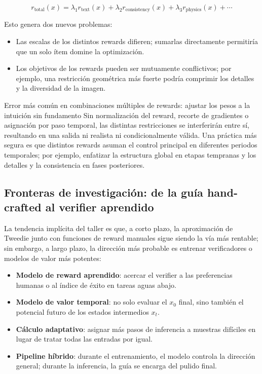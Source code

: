$$r_{\text{total}}(x) = \lambda_1 r_{\text{text}}(x) + \lambda_2 r_{\text{consistency}}(x) + \lambda_3 r_{\text{physics}}(x) + \cdots$$

Esto genera dos nuevos problemas:

\begin{itemize}
    \item Las escalas de los distintos rewards difieren; sumarlas directamente permitiría que un solo ítem domine la optimización.
    \item Los objetivos de los rewards pueden ser mutuamente conflictivos; por ejemplo, una restricción geométrica más fuerte podría comprimir los detalles y la diversidad de la imagen.
\end{itemize}

\begin{warningbox}{Error más común en combinaciones múltiples de rewards: ajustar los pesos a la intuición sin fundamento}
Sin normalización del reward, recorte de gradientes o asignación por paso temporal, las distintas restricciones se interferirán entre sí, resultando en una salida ni realista ni condicionalmente válida. Una práctica más segura es que distintos rewards asuman el control principal en diferentes periodos temporales; por ejemplo, enfatizar la estructura global en etapas tempranas y los detalles y la consistencia en fases posteriores.
\end{warningbox}

\subsection{Fronteras de investigación: de la guía hand-crafted al verifier aprendido}

La tendencia implícita del taller es que, a corto plazo, la aproximación de Tweedie junto con funciones de reward manuales sigue siendo la vía más rentable; sin embargo, a largo plazo, la dirección más probable es entrenar verificadores o modelos de valor más potentes:

\begin{itemize}
    \item \textbf{Modelo de reward aprendido}: acercar el verifier a las preferencias humanas o al índice de éxito en tareas aguas abajo.
    \item \textbf{Modelo de valor temporal}: no solo evaluar el $x_0$ final, sino también el potencial futuro de los estados intermedios $x_t$.
    \item \textbf{Cálculo adaptativo}: asignar más pasos de inferencia a muestras difíciles en lugar de tratar todas las entradas por igual.
    \item \textbf{Pipeline híbrido}: durante el entrenamiento, el modelo controla la dirección general; durante la inferencia, la guía se encarga del pulido final.
\end{itemize}

